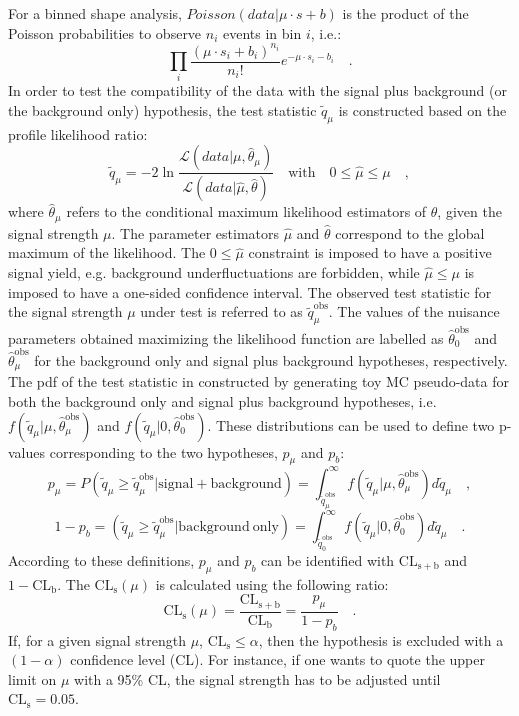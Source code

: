 For a binned shape analysis, $Poisson(data|\mu\cdot s + b)$ is the product of the Poisson probabilities to observe $n_i$ events in bin $i$, i.e.:
\begin{equation}
\prod_i \frac{(\mu\cdot s_i + b_i)^{n_i}}{n_i !} e^{-\mu\cdot s_i - b_i} \quad.
\end{equation}
In order to test the compatibility of the data with the signal plus background (or the background only) hypothesis, the test statistic $\tilde{q}_\mu$ is constructed based on the profile likelihood ratio:
\begin{equation}
\tilde{q}_\mu = -2 \ln{\frac{\mathcal{L}(data|\mu,\hat{\theta}_\mu)}{\mathcal{L}(data|\hat{\mu},\hat{\theta})	}}  \quad \mathrm{with} \quad 0 \leq \hat{\mu} \leq \mu \quad ,
\end{equation}
where $\hat{\theta}_\mu$ refers to the conditional maximum likelihood estimators of $\theta$, given the signal strength $\mu$. The parameter estimators $\hat{\mu}$ and $\hat{\theta}$ correspond to the global maximum of the likelihood. The $0 \leq \hat{\mu}$ constraint is imposed to have a positive signal yield, e.g. background underfluctuations are forbidden, while $\hat{\mu} \leq \mu$ is imposed to have a one-sided confidence interval. The observed test statistic for the signal strength $\mu$ under test is referred to as $\tilde{q}_\mu^\mathrm{obs}$. The values of the nuisance parameters obtained maximizing the likelihood function are labelled as $\hat{\theta}_0^\mathrm{obs}$ and $\hat{\theta}_\mu^\mathrm{obs}$ for the background only and signal plus background hypotheses, respectively. The pdf of the test statistic in constructed by generating toy MC pseudo-data for both the background only and signal plus background hypotheses, i.e. $f(\tilde{q}_\mu|\mu,\hat{\theta}_\mu^\mathrm{obs})$ and $f(\tilde{q}_\mu|0,\hat{\theta}_0^\mathrm{obs})$. These distributions can be used to define two p-values corresponding to the two hypotheses, $p_\mu$ and $p_b$:
\begin{equation}
p_\mu = P(\tilde{q}_\mu \geq \tilde{q}_\mu^\mathrm{obs}|\mathrm{signal+background}) = \int_{\tilde{q}_\mu^\mathrm{obs}}^{\infty} f(\tilde{q}_\mu|\mu,\hat{\theta}_\mu^\mathrm{obs}) d\tilde{q}_\mu \quad ,
\end{equation}
\begin{equation}
1 - p_b = (\tilde{q}_\mu \geq \tilde{q}_\mu^\mathrm{obs}|\mathrm{background~only}) = \int_{\tilde{q}_0^\mathrm{obs}}^{\infty} f(\tilde{q}_\mu|0,\hat{\theta}_0^\mathrm{obs}) d\tilde{q}_\mu \quad .
\end{equation}
According to these definitions, $p_\mu$ and $p_b$ can be identified with $\mathrm{CL_{s+b}}$ and $1-\mathrm{CL_b}$.
The $\mathrm{CL_s}(\mu)$ is calculated using the following ratio:
\begin{equation}
\mathrm{CL_s}(\mu) = \frac{\mathrm{CL_{s+b}}}{\mathrm{CL_b}} = \frac{p_\mu}{1-p_b} \quad .
\end{equation}
If, for a given signal strength $\mu$, $\mathrm{CL_s} \leq \alpha$, then the hypothesis is excluded with a $(1-\alpha)$ confidence level (CL). For instance, if one wants to quote the upper limit on $\mu$ with a 95\% CL, the signal strength has to be adjusted until $\mathrm{CL_s} = 0.05$.

